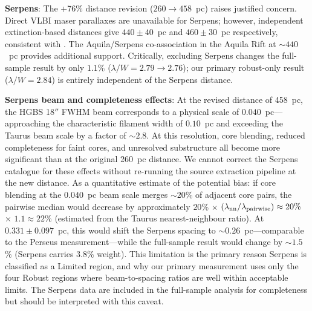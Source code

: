 \documentclass[twoside,twocolumn]{mnras}
\begin{document}
\textbf{Serpens}: The +76\% distance revision ($260 \to 458$~pc) raises justified
concern. Direct VLBI maser parallaxes are unavailable for Serpens; however, independent
extinction-based distances \citep{Yan2022, Green2024} give $440 \pm 40$~pc and
$460 \pm 30$~pc respectively, consistent with \citealt{Zhang2023}. The Aquila/Serpens
co-association in the Aquila Rift at ${\sim}440$~pc \citep{Zucker2020} provides
additional support. Critically, excluding Serpens changes the full-sample
result by only $1.1\%$ ($\lambda/W = 2.79 \to 2.76$); our primary robust-only
result ($\lambda/W = 2.84$) is entirely independent of the Serpens distance.

\textbf{Serpens beam and completeness effects}: At the revised distance of 458~pc,
the HGBS 18$''$ FWHM beam corresponds to a physical scale of $0.040$~pc---approaching
the characteristic filament width of $0.10$~pc and exceeding the Taurus beam scale by
a factor of $\sim 2.8$. At this resolution, core blending, reduced completeness for
faint cores, and unresolved substructure all become more significant than at the
original 260~pc distance. We cannot correct the Serpens catalogue for these effects
without re-running the source extraction pipeline at the new distance. As a quantitative estimate of the potential bias: if core blending at the $0.040$~pc beam scale merges ${\sim}20$\% of adjacent core pairs, the pairwise median would decrease by approximately $20$\% $\times$ $(\lambda_{\rm nn}/\lambda_{\rm pairwise}) \approx 20\%$ $\times$ $1.1 \approx 22$\% (estimated from the Taurus nearest-neighbour ratio). At $0.331 \pm 0.097$~pc, this would shift the Serpens spacing to ${\sim}0.26$~pc---comparable to the Perseus measurement---while the full-sample result would change by ${\sim}1.5$\% (Serpens carries 3.8\% weight). This limitation
is the primary reason Serpens is classified as a Limited region, and why our primary
measurement uses only the four Robust regions where beam-to-spacing ratios are well
within acceptable limits. The Serpens data are included in the full-sample analysis for
completeness but should be interpreted with this caveat.
\end{document}
